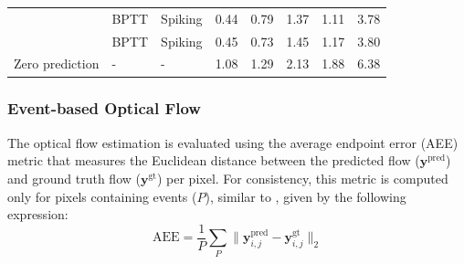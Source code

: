 \documentclass[10pt]{article} %
\begin{document}
\begin{table}[!t]
{\begin{tabular}{llllllll}
        \cite{Kosta2023Adaptive-SpikeNet:Dynamics}& BPTT  & Spiking & 0.44 & 0.79 & 1.37 & 1.11 & 3.78  \\ %

        \cite{Hagenaars2021Self-SupervisedNetworks}& BPTT  & Spiking & 0.45 & 0.73 & 1.45 & 1.17 & 3.80  \\ %
        
        Zero   prediction & -  & - & 1.08 & 1.29 & 2.13 & 1.88 & 6.38  \\ \hline
        \end{tabular}
        }
        \end{table}

        \subsubsection{Event-based Optical Flow}

        The optical flow estimation is evaluated using the average endpoint error (AEE) metric that measures the Euclidean distance between the predicted flow ($\mathbf{y}^{\text{pred}}$) and ground truth flow ($\mathbf{y}^{\text{gt}}$) per pixel.
        For consistency, this metric is computed only for pixels containing events ($P$), similar to \cite{Apolinario2023Hardware/SoftwareNetworks,Kosta2023Adaptive-SpikeNet:Dynamics, Lee2020Spike-FlowNet:Networks, Zhu2018EV-FlowNet:Cameras, Zhu2019UnsupervisedEgomotion}, given by the following expression:
        \begin{equation}
            \text{AEE}=\frac{1}{P}\sum_{P}\| \mathbf{y}^{\text{pred}}_{i,j} - \mathbf{y}^{\text{gt}}_{i,j}\|_2
        \end{equation}
\end{document}
